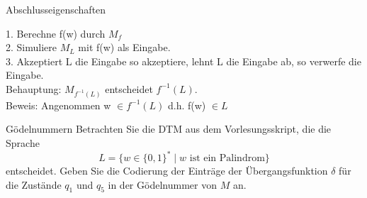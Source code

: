 \documentclass[answers]{submit}
\begin{document}
\begin{exercise}[6]{Abschlusseigenschaften}
{    1. Berechne f(w) durch $M_{f}$ \\
    2. Simuliere $M_L$ mit f(w) als Eingabe. \\
    3. Akzeptiert L die Eingabe so akzeptiere, lehnt L die Eingabe ab, so verwerfe die Eingabe. \\
    Behauptung: $M_{f^{-1}(L)}$ entscheidet  $f^{-1}(L)$. \\
    Beweis: Angenommen w $\in f^{-1}(L)$ d.h. f(w) $\in L$

  }
\end{exercise}

\begin{exercise}[6]{Gödelnummern}
  Betrachten Sie die DTM aus dem Vorlesungsskript, die die Sprache
  \[ L = \{w\in\{0,1\}^* \mid w\text{ ist ein Palindrom}\} \]
  entscheidet.
  Geben Sie die Codierung der Einträge der Übergangsfunktion $\delta$ für die Zustände $q_1$ und $q_5$ in der Gödelnummer von $M$ an.

\end{exercise}
\end{document}
